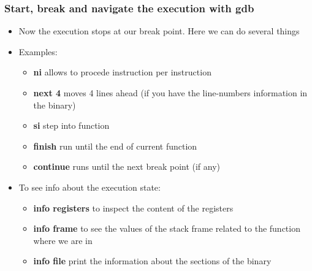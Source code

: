\documentclass[]{beamer}
\begin{document}
\begin{frame}
  \frametitle{Start, break and navigate the execution with gdb}
  \begin{itemize}
  \item{Now the execution stops at our break point. Here we
      can do several things}
  \item{Examples:}
    \begin{itemize}
    \item{{\bf ni} allows to procede instruction per instruction}
    \item{{\bf next 4} moves 4 lines ahead (if you have the
        line-numbers information in the binary)}
    \item{{\bf si} step into function}
    \item{{\bf finish} run until the end of current function}
    \item{{\bf continue} runs until the next break point (if any)}

    \end{itemize}
  \item{To see info about the execution state:}
    \begin{itemize}
    \item{{\bf info registers} to inspect the content of the registers}
    \item{{\bf info frame} to see the values of the stack frame
        related to the function where we are in}
    \item{{\bf info file} print the information about the sections of the binary}
    \end{itemize}
  \end{itemize}
\end{frame}
\end{document}
